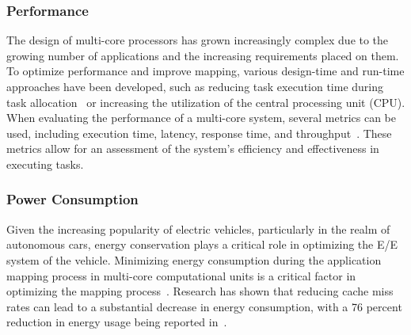 \subsubsection{Performance}%
The design of multi-core processors has grown increasingly complex due to the growing number of applications and the increasing requirements placed on them. To optimize performance and improve mapping, various design-time and run-time approaches have been developed, such as reducing task execution time during task allocation~\cite{kaida2012task} or increasing the utilization of the central processing unit (CPU).
When evaluating the performance of a multi-core system, several metrics can be used, including execution time, latency, response time, and throughput~\cite{mehrara2009multicore}. These metrics allow for an assessment of the system's efficiency and effectiveness in executing tasks.




\subsubsection{Power Consumption} %
Given the increasing popularity of electric vehicles, particularly in the realm of autonomous cars, energy conservation plays a critical role in optimizing the E/E system of the vehicle. Minimizing energy consumption during the application mapping process in multi-core computational units is a critical factor in optimizing the mapping process~\cite{xie2018reliability}. Research has shown that reducing cache miss rates can lead to a substantial decrease in energy consumption, with a 76 percent reduction in energy usage being reported in~\cite{peressmulti}.





